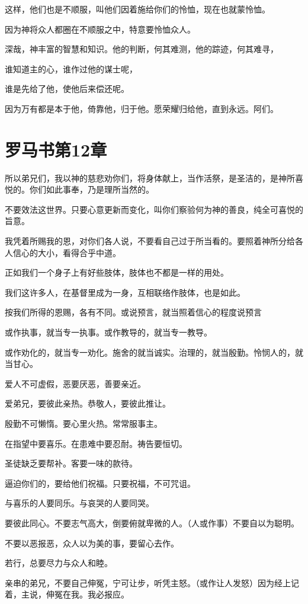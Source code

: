 \documentclass[12pt,oneside]{book}
\begin{document}
这样，他们也是不顺服，叫他们因着施给你们的怜恤，现在也就蒙怜恤。

因为神将众人都圈在不顺服之中，特意要怜恤众人。

深哉，神丰富的智慧和知识。他的判断，何其难测，他的踪迹，何其难寻，

谁知道主的心，谁作过他的谋士呢，

谁是先给了他，使他后来偿还呢。

因为万有都是本于他，倚靠他，归于他。愿荣耀归给他，直到永远。阿们。

\chapter{罗马书第12章}
所以弟兄们，我以神的慈悲劝你们，将身体献上，当作活祭，是圣洁的，是神所喜悦的。你们如此事奉，乃是理所当然的。

不要效法这世界。只要心意更新而变化，叫你们察验何为神的善良，纯全可喜悦的旨意。

我凭着所赐我的恩，对你们各人说，不要看自己过于所当看的。要照着神所分给各人信心的大小，看得合乎中道。

正如我们一个身子上有好些肢体，肢体也不都是一样的用处。

我们这许多人，在基督里成为一身，互相联络作肢体，也是如此。

按我们所得的恩赐，各有不同。或说预言，就当照着信心的程度说预言

或作执事，就当专一执事。或作教导的，就当专一教导。

或作劝化的，就当专一劝化。施舍的就当诚实。治理的，就当殷勤。怜悯人的，就当甘心。

爱人不可虚假，恶要厌恶，善要亲近。

爱弟兄，要彼此亲热。恭敬人，要彼此推让。

殷勤不可懒惰。要心里火热。常常服事主。

在指望中要喜乐。在患难中要忍耐。祷告要恒切。

圣徒缺乏要帮补。客要一味的款待。

逼迫你们的，要给他们祝福。只要祝福，不可咒诅。

与喜乐的人要同乐。与哀哭的人要同哭。

要彼此同心。不要志气高大，倒要俯就卑微的人。（人或作事）不要自以为聪明。

不要以恶报恶，众人以为美的事，要留心去作。

若行，总要尽力与众人和睦。

亲串的弟兄，不要自己伸冤，宁可让步，听凭主怒。（或作让人发怒）因为经上记着，主说，伸冤在我。我必报应。
\end{document}
